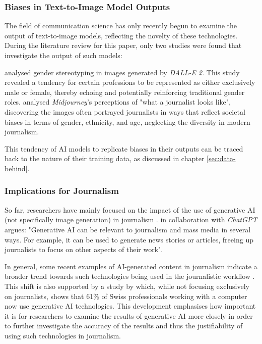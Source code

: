 \label{sec:data-behind}


\subsubsection{Biases in Text-to-Image Model Outputs}
The field of communication science has only recently begun to examine the output of text-to-image models, reflecting the novelty of these technologies. During the literature review for this paper, only two studies were found that investigate the output of such models:

\textcite{Garcia2023} analysed gender stereotyping in images generated by \textit{DALL-E 2}. This study revealed a tendency for certain professions to be represented as either exclusively male or female, thereby echoing and potentially reinforcing traditional gender roles. \textcite{Thomas2023} analysed \textit{Midjourney}'s perceptions of "what a journalist looks like", discovering the images often portrayed journalists in ways that reflect societal biases in terms of gender, ethnicity, and age, neglecting the diversity in modern journalism.

This tendency of AI models to replicate biases in their outputs can be traced back to the nature of their training data, as discussed in chapter \ref{sec:data-behind}. 

\subsubsection{Implications for Journalism}

So far, researchers have mainly focused on the impact of the use of generative AI (not specifically image generation) in journalism \parencite{Broussard2019}. \textcite[87]{Pavlik2023} in collaboration with \textit{ChatGPT} argues: "Generative AI can be relevant to journalism and mass media in several ways. For example, it can be used to generate news stories or articles, freeing up journalists to focus on other aspects of their work".

In general, some recent examples of AI-generated content in journalism indicate a broader trend towards such technologies being used in the journalistic workflow \parencite{Henrich2023, Kim2023}. This shift is also supported by a study by \textcite{Deloitte2023} which, while not focusing exclusively on journalists, shows that 61\% of Swiss professionals working with a computer now use generative AI technologies. This development emphasises how important it is for researchers to examine the results of generative AI more closely in order to further investigate the accuracy of the results and thus the justifiability of using such technologies in journalism.

